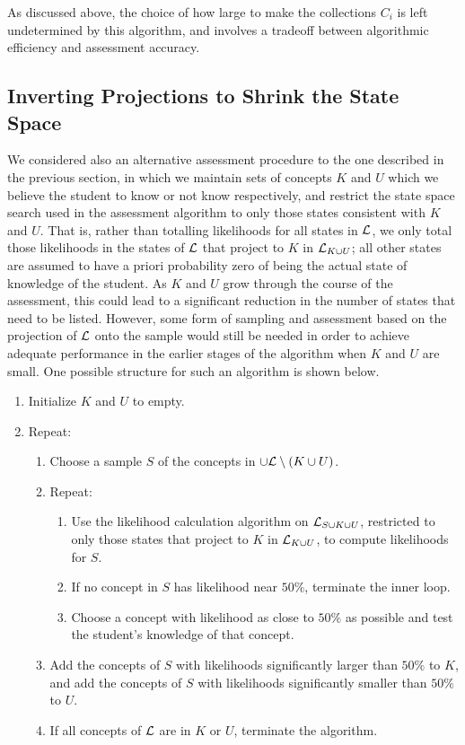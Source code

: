 \documentclass[11pt]{llncs}
\begin{document}
{As discussed above, the choice of how large to make the collections $C_i$ is left undetermined by this algorithm, and involves a tradeoff between algorithmic efficiency and assessment accuracy.

\subsection{Inverting Projections to Shrink the State Space}

We considered also an alternative assessment procedure to the one described in the previous section, in which we maintain sets of concepts $K$ and $U$ which we believe the student to know or not know respectively, and restrict the state space search used in the assessment algorithm to only those states consistent with $K$ and $U$. That is, rather than totalling likelihoods for all states in ${\cal L}$, we only
total those likelihoods in the states of ${\cal L}$ that project to $K$ in ${\cal L}_{K\cup U}$; all other states are assumed to have a priori probability zero of being the actual state of knowledge of the student. As $K$ and $U$ grow through the course of the assessment, this could lead to a significant reduction in the number of states that need to be listed.  However, some form of sampling and assessment based on the projection of $\cal L$ onto the sample would still be needed in order to achieve adequate performance in the earlier stages of the algorithm when $K$ and $U$ are small. One possible structure for such an algorithm is shown below.

\begin{enumerate}
\item Initialize $K$ and $U$ to empty.
\item Repeat:
\begin{enumerate}
\item Choose a sample $S$ of the concepts in $\cup{\cal L}\setminus(K\cup U)$.
\item Repeat:
\begin{enumerate}
\item Use the likelihood calculation algorithm on ${\cal L}_{S\cup K\cup U}$, restricted to
only those states that project to $K$ in ${\cal L}_{K\cup U}$, to compute likelihoods for $S$.
\item If no concept in $S$ has likelihood near $50\%$, terminate the inner loop.
\item Choose a concept with likelihood as close to $50\%$ as possible and test the student's knowledge of that concept.
\end{enumerate}
\item Add the concepts of $S$ with likelihoods significantly larger than $50\%$ to $K$, and add the concepts of $S$ with likelihoods significantly smaller than $50\%$ to $U$.
\item If all concepts of ${\cal L}$ are in $K$ or $U$, terminate the algorithm.
\end{enumerate}
\end{enumerate}

}
\end{document}
